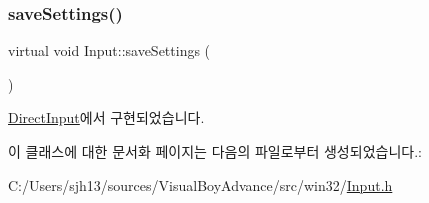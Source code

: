 \subsubsection{\texorpdfstring{save\+Settings()}{saveSettings()}}
{\footnotesize\ttfamily virtual void Input\+::save\+Settings (\begin{DoxyParamCaption}{ }\end{DoxyParamCaption})\hspace{0.3cm}{\ttfamily [pure virtual]}}



\mbox{\hyperlink{class_direct_input_aaf3473a97962c8dad1ef6715b5164c9d}{Direct\+Input}}에서 구현되었습니다.



이 클래스에 대한 문서화 페이지는 다음의 파일로부터 생성되었습니다.\+:\begin{DoxyCompactItemize}
\item 
C\+:/\+Users/sjh13/sources/\+Visual\+Boy\+Advance/src/win32/\mbox{\hyperlink{win32_2input_8h}{Input.\+h}}\end{DoxyCompactItemize}
